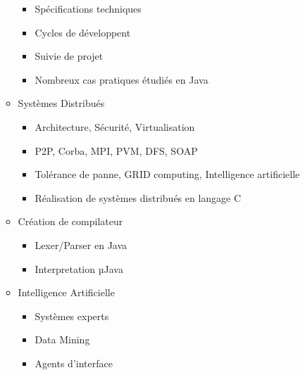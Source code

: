 \documentclass[a4paper,10pt]{article}
\begin{document}
\begin{itemize}
\begin{itemize}
				\begin{itemize}
					\item Spécifications techniques
					\item Cycles de développent
					\item Suivie de projet
					\item Nombreux cas pratiques étudiés en Java
				\end{itemize}
				\item Systèmes Distribués
				\begin{itemize}
					\item Architecture, Sécurité, Virtualisation
					\item P2P, Corba, MPI, PVM, DFS, SOAP
					\item Tolérance de panne, GRID computing, Intelligence artificielle
					\item Réalisation de systèmes distribués en langage C
				\end{itemize}
			\item Création de compilateur
				\begin{itemize}
					\item Lexer/Parser en Java
					\item Interpretation µJava
				\end{itemize}
			\item Intelligence Artificielle
				\begin{itemize}
					\item Systèmes experts
					\item Data Mining
					\item Agents d'interface
				\end{itemize}
		\end{itemize}
\end{itemize}
\end{document}
